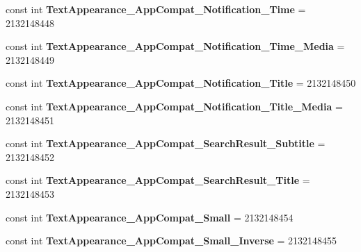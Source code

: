 \begin{DoxyCompactItemize}
\item 
\mbox{\label{classst_delivery_1_1_resource_1_1_style_a0a0ead188bacc411b003c6093aad0a23}} 
const int {\bfseries Text\+Appearance\+\_\+\+App\+Compat\+\_\+\+Notification\+\_\+\+Time} = 2132148448
\item 
\mbox{\label{classst_delivery_1_1_resource_1_1_style_a5b9e06045e9f68efff74d68065be49a1}} 
const int {\bfseries Text\+Appearance\+\_\+\+App\+Compat\+\_\+\+Notification\+\_\+\+Time\+\_\+\+Media} = 2132148449
\item 
\mbox{\label{classst_delivery_1_1_resource_1_1_style_a98b1e68fb914354d1f8272e8718f4f47}} 
const int {\bfseries Text\+Appearance\+\_\+\+App\+Compat\+\_\+\+Notification\+\_\+\+Title} = 2132148450
\item 
\mbox{\label{classst_delivery_1_1_resource_1_1_style_a00266377512dfbec6467e390f0627713}} 
const int {\bfseries Text\+Appearance\+\_\+\+App\+Compat\+\_\+\+Notification\+\_\+\+Title\+\_\+\+Media} = 2132148451
\item 
\mbox{\label{classst_delivery_1_1_resource_1_1_style_a1a334c0f3acd912d45c67be7a0df12cf}} 
const int {\bfseries Text\+Appearance\+\_\+\+App\+Compat\+\_\+\+Search\+Result\+\_\+\+Subtitle} = 2132148452
\item 
\mbox{\label{classst_delivery_1_1_resource_1_1_style_af7f4f5ee08b5e68d36bce750c313d8f1}} 
const int {\bfseries Text\+Appearance\+\_\+\+App\+Compat\+\_\+\+Search\+Result\+\_\+\+Title} = 2132148453
\item 
\mbox{\label{classst_delivery_1_1_resource_1_1_style_ae6cea914e2444f94cf2342bd36dc80f5}} 
const int {\bfseries Text\+Appearance\+\_\+\+App\+Compat\+\_\+\+Small} = 2132148454
\item 
\mbox{\label{classst_delivery_1_1_resource_1_1_style_abee284a2a32b445bb09a992efb268e36}} 
const int {\bfseries Text\+Appearance\+\_\+\+App\+Compat\+\_\+\+Small\+\_\+\+Inverse} = 2132148455

\end{DoxyCompactItemize}
